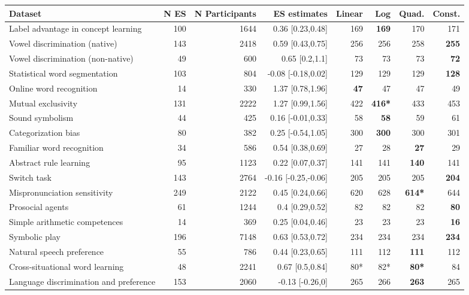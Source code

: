 \documentclass[10pt, letterpaper]{article}
\begin{document}
\begin{table}[ht]
\begin{tabular}{l|r|r|r|r|r|r|r}

\hline
\textbf{Dataset} & N ES & N Participants & ES estimates & Linear & Log & Quad. & Const.\\
\hline
Label advantage in concept learning & 100 & 1644 & 0.36 [0.23,0.48] & 169 & \textbf{169} & 170 & 171\\
Vowel discrimination (native) & 143 & 2418 & 0.59 [0.43,0.75] & 256 & 256 & 258 & \textbf{255}\\
Vowel discrimination (non-native) & 49 & 600 & 0.65 [0.2,1.1] & 73 & 73 & 73 & \textbf{72}\\
Statistical word segmentation & 103 & 804 & -0.08 [-0.18,0.02] & 129 & 129 & 129 & \textbf{128}\\
Online word recognition & 14 & 330 & 1.37 [0.78,1.96] & \textbf{47} & 47 & 47 & 49\\
Mutual exclusivity & 131 & 2222 & 1.27 [0.99,1.56] & 422 & \textbf{416*} & 433 & 453\\
Sound symbolism & 44 & 425 & 0.16 [-0.01,0.33] & 58 & \textbf{58} & 59 & 61\\
Categorization bias & 80 & 382 & 0.25 [-0.54,1.05] & 300 & \textbf{300} & 300 & 301\\
Familiar word recognition & 34 & 586 & 0.54 [0.38,0.69] & 27 & 28 & \textbf{27} & 29\\
Abstract rule learning & 95 & 1123 & 0.22 [0.07,0.37] & 141 & 141 & \textbf{140} & 141\\
Switch task & 143 & 2764 & -0.16 [-0.25,-0.06] & 205 & 205 & 205 & \textbf{204}\\
Mispronunciation sensitivity & 249 & 2122 & 0.45 [0.24,0.66] & 620 & 628 & \textbf{614*} & 644\\
Prosocial agents & 61 & 1244 & 0.4 [0.29,0.52] & 82 & 82 & 82 & \textbf{80}\\
Simple arithmetic competences & 14 & 369 & 0.25 [0.04,0.46] & 23 & 23 & 23 & \textbf{16}\\
Symbolic play & 196 & 7148 & 0.63 [0.53,0.72] & 234 & 234 & 234 & \textbf{234}\\
Natural speech preference & 55 & 786 & 0.44 [0.23,0.65] & 111 & 112 & \textbf{111} & 112\\
Cross-situational word learning & 48 & 2241 & 0.67 [0.5,0.84] & 80* & 82* & \textbf{80*} & 84\\
Language discrimination and preference & 153 & 2060 & -0.13 [-0.26,0] & 265 & 266 & \textbf{263} & 265\\

\end{tabular}
\end{table}
\end{document}
